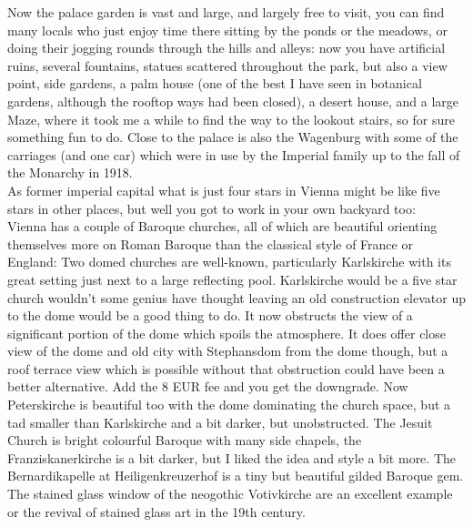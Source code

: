 Now the palace garden is vast and large, and largely free to visit, you can find many locals who just enjoy time there sitting by the ponds or the meadows, or doing their jogging rounds through the hills and alleys: now you have artificial ruins, several fountains, statues scattered throughout the park, but also a view point, side gardens, a palm house (one of the best I have seen in botanical gardens, although the rooftop ways had been closed), a desert house, and a large Maze, where it took me a while to find the way to the lookout stairs, so for sure something fun to do. Close to the palace is also the Wagenburg with some of the carriages (and one car) which were in use by the Imperial family up to the fall of the Monarchy in 1918.\\

As former imperial capital what is just four stars in Vienna might be like five stars in other places, but well you got to work in your own backyard too:\\
Vienna has a couple of Baroque churches, all of which are beautiful orienting themselves more on Roman Baroque than the classical style of France or England: Two domed churches are well-known, particularly Karlskirche with its great setting just next to a large reflecting pool. Karlskirche would be a five star church wouldn't some genius have thought leaving an old construction elevator up to the dome would be a good thing to do. It now obstructs the view of a significant portion of the dome which spoils the atmosphere. It does offer close view of the dome and old city with Stephansdom from the dome though, but a roof terrace view which is possible without that obstruction could have been a better alternative. Add the 8 EUR fee and you get the downgrade. Now Peterskirche is beautiful too with the dome dominating the church space, but a tad smaller than Karlskirche and a bit darker, but unobstructed. The Jesuit Church is bright colourful Baroque with many side chapels, the Franziskanerkirche is a bit darker, but I liked the idea and style a bit more. The Bernardikapelle at Heiligenkreuzerhof is a tiny but beautiful gilded Baroque gem. The stained glass window of the neogothic Votivkirche are an excellent example or the revival of stained glass art in the 19th century.\\

